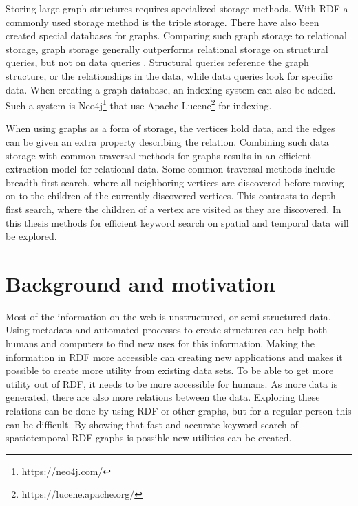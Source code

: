 Storing large graph structures requires specialized storage methods. With RDF a commonly used storage method is the triple storage. There have also been created special databases for graphs. Comparing such graph storage to relational storage, graph storage generally outperforms relational storage on structural queries, but not on data queries \cite{AComparisonOfGraphAndRelDB}. Structural queries reference the graph structure, or the relationships in the data, while data queries look for specific data. When creating a graph database, an indexing system can also be added. Such a system is Neo4j\footnote{https://neo4j.com/} that use Apache Lucene\footnote{https://lucene.apache.org/} for indexing.

When using graphs as a form of storage, the vertices hold data, and the edges can be given an extra property describing the relation. Combining such data storage with common traversal methods for graphs results in an efficient extraction model for relational data. Some common traversal methods include breadth first search, where all neighboring vertices are discovered before moving on to the children of the currently discovered vertices. This contrasts to depth first search, where the children of a vertex are visited as they are discovered. In this thesis methods for efficient keyword search on spatial and temporal data will be explored.

\section{Background and motivation}
\label{sec:BackgroundAndMotivation}
Most of the information on the web is unstructured, or semi-structured data. Using metadata and automated processes to create structures can help both humans and computers to find new uses for this information. Making the information in RDF more accessible can creating new applications and makes it possible to create more utility from existing data sets. To be able to get more utility out of RDF, it needs to be more accessible for humans. As more data is generated, there are also more relations between the data. Exploring these relations can be done by using RDF or other graphs, but for a regular person this can be difficult. By showing that fast and accurate keyword search of spatiotemporal RDF graphs is possible new utilities can be created.

